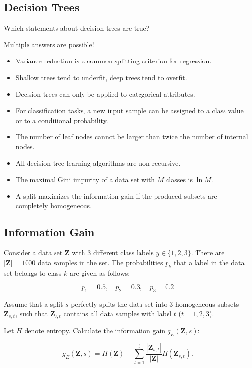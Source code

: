\documentclass{article}
\begin{document}
\subsection*{Decision Trees}

Which statements about decision trees are true?

Multiple answers are possible!

\begin{itemize}
    \item[a)] Variance reduction is a common splitting criterion for regression.
    \item[b)] Shallow trees tend to underfit, deep trees tend to overfit.
    \item[c)] Decision trees can only be applied to categorical attributes.
    \item[d)] For classification tasks, a new input sample can be assigned to a class value or to a conditional probability.
    \item[e)] The number of leaf nodes cannot be larger than twice the number of internal nodes.
    \item[f)] All decision tree learning algorithms are non-recursive.
    \item[g)] The maximal Gini impurity of a data set with \(M\) classes is \(\ln M\).
    \item[h)] A split maximizes the information gain if the produced subsets are completely homogeneous.
\end{itemize}

\subsection*{Information Gain}

Consider a data set \(\mathbf{Z}\) with 3 different class labels \(y \in \{1, 2, 3\}\). There are \(|\mathbf{Z}| = 1000\) data samples in the set. The probabilities \(p_k\) that a label in the data set belongs to class \(k\) are given as follows:

\[
p_1 = 0.5, \quad p_2 = 0.3, \quad p_3 = 0.2
\]

Assume that a split \(s\) perfectly splits the data set into 3 homogeneous subsets \(\mathbf{Z}_{s,t}\), such that \(\mathbf{Z}_{s,t}\) contains all data samples with label \(t\) (\(t = 1, 2, 3\)).

Let \(H\) denote entropy. Calculate the information gain \(g_E(\mathbf{Z}, s)\):

\[
g_E(\mathbf{Z}, s) = H(\mathbf{Z}) - \sum_{t=1}^3 \frac{|\mathbf{Z}_{s,t}|}{|\mathbf{Z}|} H(\mathbf{Z}_{s,t}).
\]
\end{document}
